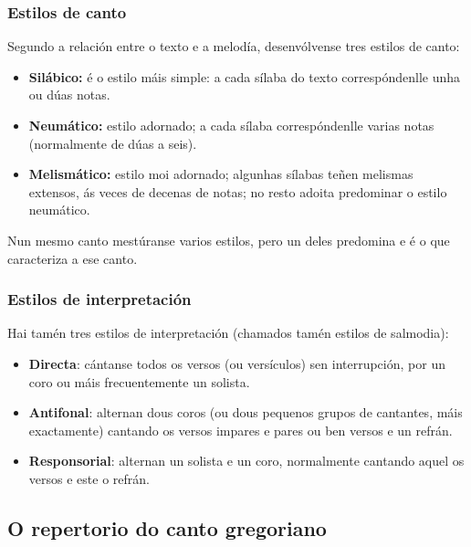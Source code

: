 \documentclass[spanish, a4paper,nobind]{templates/ociamthesis}
\providecommand{\tightlist}{%
  \setlength{\itemsep}{0pt}\setlength{\parskip}{0pt}}
\begin{document}
\hypertarget{estilos-de-canto}{%
\subsubsection*{Estilos de canto}\label{estilos-de-canto}}

Segundo a relación entre o texto e a melodía, desenvólvense tres estilos de canto:

\begin{itemize}
\tightlist
\item
  \textbf{Silábico:} é o estilo máis simple: a cada sílaba do texto correspóndenlle unha ou dúas notas.
\item
  \textbf{Neumático:} estilo adornado; a cada sílaba correspóndenlle varias notas (normalmente de dúas a seis).
\item
  \textbf{Melismático:} estilo moi adornado; algunhas sílabas teñen melismas extensos, ás veces de decenas de notas; no resto adoita predominar o estilo neumático.
\end{itemize}

Nun mesmo canto mestúranse varios estilos, pero un deles predomina e é o que caracteriza a ese canto.

\hypertarget{estilos-de-interpretaciuxf3n}{%
\subsubsection*{Estilos de interpretación}\label{estilos-de-interpretaciuxf3n}}

Hai tamén tres estilos de interpretación (chamados tamén estilos de salmodia):

\begin{itemize}
\tightlist
\item
  \textbf{Directa}: cántanse todos os versos (ou versículos) sen interrupción, por un coro ou máis frecuentemente un solista.
\item
  \textbf{Antifonal}: alternan dous coros (ou dous pequenos grupos de cantantes, máis exactamente) cantando os versos impares e pares ou ben versos e un refrán.
\item
  \textbf{Responsorial}: alternan un solista e un coro, normalmente cantando aquel os versos e este o refrán.
\end{itemize}

\hypertarget{o-repertorio-do-canto-gregoriano}{%
\subsection*{O repertorio do canto gregoriano}\label{o-repertorio-do-canto-gregoriano}}
\end{document}
